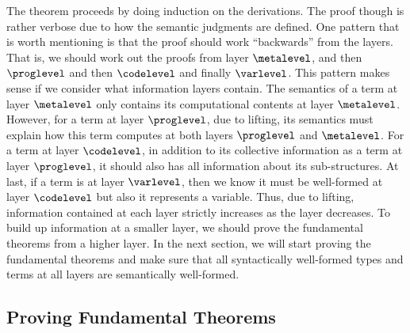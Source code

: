 The theorem proceeds by doing induction on the derivations. %
The proof though is rather verbose due to how the semantic judgments are defined. %
One pattern that is worth mentioning is that the proof should work ``backwards'' from
the layers. %
That is, we should work out the proofs from layer $\metalevel$, and then $\proglevel$ and then $\codelevel$ and
finally $\varlevel$. %
This pattern makes sense if we consider what information layers contain. %
The semantics of a term at layer $\metalevel$ only contains its computational contents at layer
$\metalevel$. %
However, for a term at layer $\proglevel$, due to lifting, its semantics must explain how this
term computes at both layers $\proglevel$ and $\metalevel$. %
For a term at layer $\codelevel$, in addition to its collective information as a term at layer
$\proglevel$, it should also has all information about its sub-structures. %
At last, if a term is at layer $\varlevel$, then we know it must be well-formed at layer $\codelevel$
but also it represents a variable. %
Thus, due to lifting, information contained at each layer strictly increases as the
layer decreases.  To build up information at a smaller layer, we should prove the
fundamental theorems from a higher layer. %
In the next section, we will start proving the fundamental theorems and make sure that
all syntactically well-formed types and terms at all layers are semantically
well-formed.

\subsection{Proving Fundamental Theorems}

